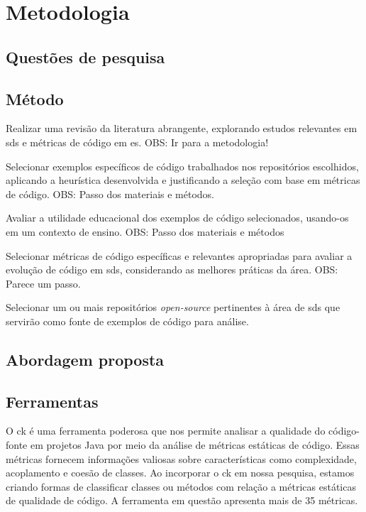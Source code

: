 
\chapter{Metodologia}\label{cap:Metodologia}

\section{Questões de pesquisa}

\section{Método}
    \item Realizar uma revisão da literatura abrangente, explorando estudos relevantes em \gls{sds} e métricas de código em \gls{es}. OBS: Ir para a metodologia!
    \item Selecionar exemplos específicos de código trabalhados nos repositórios escolhidos, aplicando a heurística desenvolvida e justificando a seleção com base em métricas de código. OBS: Passo dos materiais e métodos.
    \item Avaliar a utilidade educacional dos exemplos de código selecionados, usando-os em um contexto de ensino. OBS: Passo dos materiais e métodos
    \item Selecionar métricas de código específicas e relevantes apropriadas para avaliar a evolução de código em \gls{sds}, considerando as melhores práticas da área. OBS: Parece um passo.
    \item Selecionar um ou mais repositórios \textit{open-source} pertinentes à área de \gls{sds} que servirão como fonte de exemplos de código para análise.

\section{Abordagem proposta}

\section{Ferramentas}\label{sec:ferramentas}
O \gls{ck} \cite{aniche-ck} é uma ferramenta poderosa que nos permite analisar a qualidade do código-fonte em projetos Java por meio da análise de métricas estáticas de código. Essas métricas fornecem informações valiosas sobre características como complexidade, acoplamento e coesão de classes. Ao incorporar o \gls{ck} em nossa pesquisa, estamos criando formas de classificar classes ou métodos com relação a métricas estáticas de qualidade de código. A ferramenta em questão apresenta mais de 35 métricas.

